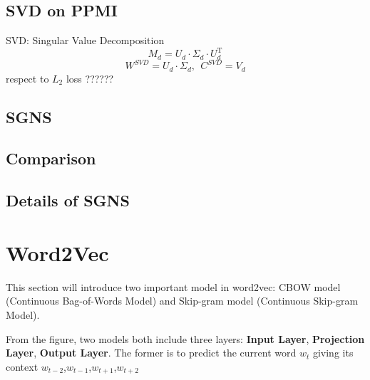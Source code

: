 \documentclass[12pt,a4paper,twoside]{book}
\begin{document}
\subsection{SVD on PPMI} 
SVD: Singular Value Decomposition \\
$$M_d = U_d\cdot\Sigma_d\cdot U_d^{\mathrm{T}}$$
$$W^{SVD} = U_d\cdot\Sigma_d, \ \ C^{SVD} = V_d$$
respect to $L_2$ loss ??????
\subsection{SGNS}

\subsection{Comparison}
\subsection{Details of SGNS}

\section{Word2Vec}
This section will introduce two important model in word2vec: CBOW model (Continuous Bag-of-Words Model) and Skip-gram model (Continuous Skip-gram Model). 

From the figure, two models both include three layers: \textbf{Input Layer}, \textbf{Projection Layer}, \textbf{Output Layer}. The former is to predict the current word $w_t$ giving its context $w_{t-2}$,$w_{t-1}$,$w_{t+1}$,$w_{t+2}$
\end{document}
